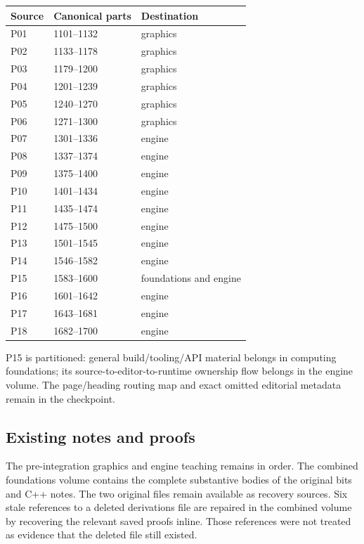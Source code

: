 {\def\LTcaptype{none} %
\begin{longtable}[]{@{}lll@{}}
\toprule\noalign{}
Source & Canonical parts & Destination \\
\midrule\noalign{}
\endhead
\bottomrule\noalign{}
\endlastfoot
P01 & 1101--1132 & graphics \\
P02 & 1133--1178 & graphics \\
P03 & 1179--1200 & graphics \\
P04 & 1201--1239 & graphics \\
P05 & 1240--1270 & graphics \\
P06 & 1271--1300 & graphics \\
P07 & 1301--1336 & engine \\
P08 & 1337--1374 & engine \\
P09 & 1375--1400 & engine \\
P10 & 1401--1434 & engine \\
P11 & 1435--1474 & engine \\
P12 & 1475--1500 & engine \\
P13 & 1501--1545 & engine \\
P14 & 1546--1582 & engine \\
P15 & 1583--1600 & foundations and engine \\
P16 & 1601--1642 & engine \\
P17 & 1643--1681 & engine \\
P18 & 1682--1700 & engine \\
\end{longtable}
}

P15 is partitioned: general build/tooling/API material belongs in computing foundations; its source-to-editor-to-runtime ownership flow belongs in the engine volume. The page/heading routing map and exact omitted editorial metadata remain in the checkpoint.

\subsection{Existing notes and proofs}\label{appendix-3b67654799a2-existing-notes-and-proofs}

The pre-integration graphics and engine teaching remains in order. The combined foundations volume contains the complete substantive bodies of the original bits and C++ notes. The two original files remain available as recovery sources. Six stale references to a deleted derivations file are repaired in the combined volume by recovering the relevant saved proofs inline. Those references were not treated as evidence that the deleted file still existed.

